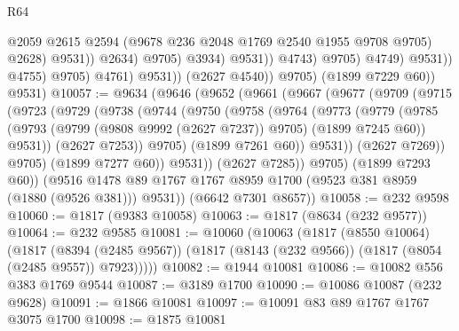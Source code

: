 \begin{lexlean}{R64}
\begin{coremodule}
                                                @2059
                                                @2615
                                                @2594
                                                (@9678 @236 @2048 @1769 @2540 @1955 @9708 @9705)
                                                @2628)
                                              @9531))
                                          @2634)
                                        @9705)
                                      @3934)
                                    @9531))
                                @4743)
                              @9705)
                            @4749)
                          @9531))
                      @4755)
                    @9705)
                  @4761)
                @9531))
            (@2627 @4540))
          @9705)
        (@1899 @7229 @60))
      @9531)
@10057 := @9634
    (@9646
      (@9652
        (@9661
          (@9667
            (@9677
              (@9709
                (@9715
                  (@9723
                    (@9729
                      (@9738
                        (@9744
                          (@9750
                            (@9758
                              (@9764
                                (@9773
                                  (@9779
                                    (@9785
                                      (@9793
                                        (@9799 (@9808 @9992 (@2627 @7237)) @9705)
                                        (@1899 @7245 @60))
                                      @9531))
                                  (@2627 @7253))
                                @9705)
                              (@1899 @7261 @60))
                            @9531))
                        (@2627 @7269))
                      @9705)
                    (@1899 @7277 @60))
                  @9531))
              (@2627 @7285))
            @9705)
          (@1899 @7293 @60))
        (@9516 @1478 @89 @1767 @1767 @8959 @1700 (@9523 @381 @8959 (@1880 (@9526 @381))) @9531))
      (@6642 @7301 @8657))
@10058 := @232 @9598
@10060 := @1817 (@9383 @10058)
@10063 := @1817 (@8634 (@232 @9577))
@10064 := @232 @9585
@10081 := @10060
    (@10063
      (@1817
        (@8550 @10064)
        (@1817
          (@8394 (@2485 @9567))
          (@1817 (@8143 (@232 @9566)) (@1817 (@8054 (@2485 @9557)) @7923)))))
@10082 := @1944 @10081
@10086 := @10082 @556 @383 @1769 @9544
@10087 := @3189 @1700
@10090 := @10086 @10087 (@232 @9628)
@10091 := @1866 @10081
@10097 := @10091 @83 @89 @1767 @1767 @3075 @1700
@10098 := @1875 @10081

\end{coremodule}
\end{lexlean}
